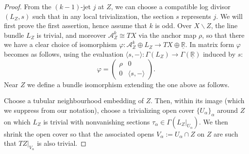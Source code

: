 \documentclass[10pt,a4paper]{amsart}
\numberwithin{equation}{section}
\begin{document}
\begin{proof} From the $(k-1)$-jet $j$ at $Z$, we can choose a compatible log divisor $(L_Z,s)$ such that in any local trivialization, the section $s$ represents $j$. We will first prove the first assertion, hence assume that $k$ is odd. Over $X \backslash Z$, the line bundle $L_Z$ is trivial, and moreover $\mathcal{A}_Z^k \cong TX$ via the anchor map $\rho$, so that there we have a clear choice of isomorphism $\varphi\colon \mathcal{A}_Z^k \oplus L_Z \to TX \oplus \underline{\mathbb{R}}$. In matrix form $\varphi$ becomes as follows, using the evaluation $\langle s , - \rangle\colon \Gamma(L_Z) \to \Gamma(\underline{\mathbb{R}})$ induced by $s$:
\begin{displaymath}
 	\varphi = \begin{pmatrix} \rho & 0 \\ 0 & \langle s , - \rangle \end{pmatrix}.
\end{displaymath}
Near $Z$ we define a bundle isomorphism extending the one above as follows.

Choose a tubular neighbourhood embedding of $Z$. Then, within its image (which we suppress from our notation), choose a trivializing open cover $\{U_\alpha\}_\alpha$ around $Z$ on which $L_Z$ is trivial with nonvanishing sections $\tau_\alpha \in \Gamma(L_Z|_{U_\alpha})$. We then shrink the open cover so that the associated opens $V_\alpha := U_\alpha \cap Z$ on $Z$ are such that $TZ|_{V_\alpha}$ is also trivial.


\end{proof}
\end{document}
